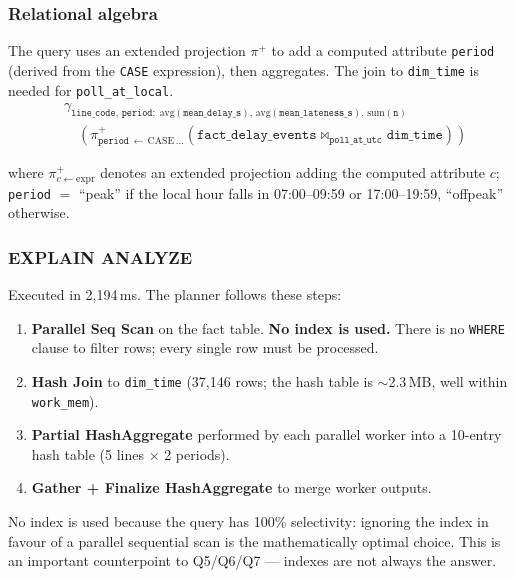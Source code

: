 \documentclass[a4paper,11pt]{article}
\begin{document}
\subsubsection{Relational algebra}

The query uses an extended projection $\pi^+$ to add a computed attribute
\texttt{period} (derived from the \texttt{CASE} expression), then aggregates.
The join to \texttt{dim\_time} is needed for \texttt{poll\_at\_local}.
\begin{align*}
  &\gamma_{\texttt{line\_code},\,\texttt{period};\;
    \text{avg}(\texttt{mean\_delay\_s}),\,\text{avg}(\texttt{mean\_lateness\_s}),\,\text{sum}(\texttt{n})} \\
  &\quad\left(
    \pi^+_{\texttt{period}\,\leftarrow\,\text{CASE}\,\ldots}
    \!\left(
      \texttt{fact\_delay\_events} \bowtie_{\texttt{poll\_at\_utc}} \texttt{dim\_time}
    \right)
  \right)
\end{align*}

where $\pi^+_{c \leftarrow \text{expr}}$ denotes an extended projection adding
the computed attribute $c$; \texttt{period} $= $ ``peak'' if the local hour
falls in 07:00--09:59 or 17:00--19:59, ``offpeak'' otherwise.

\subsubsection{EXPLAIN ANALYZE}

Executed in 2,194\,ms. The planner follows these steps:
\begin{enumerate}
  \item \textbf{Parallel Seq Scan} on the fact table. \textbf{No index is used.}
    There is no \texttt{WHERE} clause to filter rows; every single row must be
    processed.
  \item \textbf{Hash Join} to \texttt{dim\_time} (37,146 rows; the hash table
    is ${\sim}$2.3\,MB, well within \texttt{work\_mem}).
  \item \textbf{Partial HashAggregate} performed by each parallel worker into
    a 10-entry hash table (5 lines $\times$ 2 periods).
  \item \textbf{Gather + Finalize HashAggregate} to merge worker outputs.
\end{enumerate}
No index is used because the query has 100\% selectivity: ignoring the index
in favour of a parallel sequential scan is the mathematically optimal choice.
This is an important counterpoint to Q5/Q6/Q7 --- indexes are not always
the answer.
\end{document}
